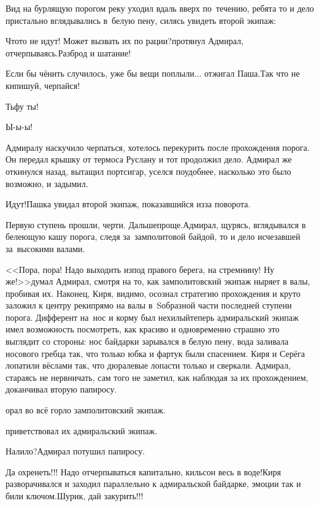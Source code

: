 Вид на бурлящую порогом реку уходил вдаль вверх по~течению, ребята то и дело пристально вглядывались в~белую пену, силясь увидеть второй экипаж:

\diagdash Что\sdash то не идут! Может вызвать их по рации?\mdash протянул Адмирал, отчерпываясь.\mdash Разброд и шатание!

\diagdash Если бы чё\sdash нить случилось, уже бы вещи поплыли$\ldots$ \mdash отжигал Паша.\mdash Так что не кипишуй, черпайся!

\diagdash Тьфу ты!

\diagdash Ы-ы-ы!

Адмиралу наскучило черпаться, хотелось перекурить после прохождения порога. Он передал крышку от термоса Руслану и тот продолжил дело. Адмирал же откинулся назад, вытащил портсигар, уселся поудобнее, насколько это было возможно, и задымил.

\diagdash Идут!\mdash Пашка увидал второй экипаж, показавшийся из\sdash за поворота. 

\diagdash Первую ступень прошли, черти. Дальше\mdash проще.\mdash Адмирал, щурясь, вглядывался в белеющую кашу порога, следя за~замполитовой байдой, то и дело исчезавшей за~высокими валами.%

<<Пора, пора! Надо выходить из\sdash под правого берега, на стремнину! Ну же!>>\mdash думал Адмирал, смотря на то, как замполитовский экипаж ныряет в валы, пробивая их. Наконец, Киря, видимо, осознал стратегию прохождения и круто заложил к центру реки\mdash прямо на валы в~S\sdash образной части последней ступени порога. Дифферент на~нос и корму был нехилый\mdash теперь адмиральский экипаж имел возможность посмотреть, как красиво и одновременно страшно это выглядит со стороны: нос байдарки зарывался в белую пену, вода заливала носового гребца так, что только юбка и фартук были спасением. Киря и Серёга лопатили вёслами так, что дюралевые лопасти только и сверкали. Адмирал, стараясь не нервничать, сам того не заметил, как наблюдая за их прохождением, доканчивал вторую папиросу.

\mdash орал во всё горло замполитовский экипаж.

\mdash приветствовал их адмиральский экипаж.

\diagdash Налило?\mdash Адмирал потушил папиросу.

\diagdash Да охренеть!!! Надо отчерпываться капитально, кильсон весь в воде!\mdash Киря разворачивался и заходил параллельно к адмиральской байдарке, эмоции так и били ключом.\mdash Шурик, дай закурить!!!

